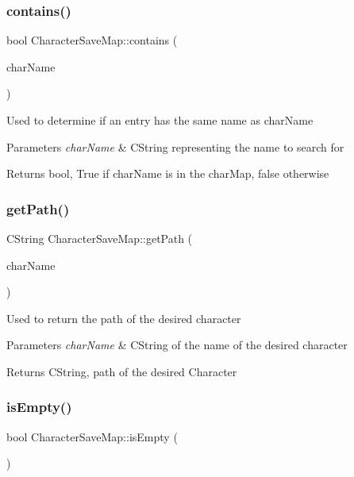 \subsubsection{\texorpdfstring{contains()}{contains()}}
{\footnotesize\ttfamily bool Character\+Save\+Map\+::contains (\begin{DoxyParamCaption}\item[{const C\+String \&}]{char\+Name }\end{DoxyParamCaption})}

Used to determine if an entry has the same name as char\+Name 
\begin{DoxyParams}{Parameters}
{\em char\+Name} & C\+String representing the name to search for \\
\hline
\end{DoxyParams}
\begin{DoxyReturn}{Returns}
bool, True if char\+Name is in the char\+Map, false otherwise 
\end{DoxyReturn}
\hypertarget{class_character_save_map_ae522be138bfeab45d12a255020150110}{}\label{class_character_save_map_ae522be138bfeab45d12a255020150110} 
\subsubsection{\texorpdfstring{get\+Path()}{getPath()}}
{\footnotesize\ttfamily C\+String Character\+Save\+Map\+::get\+Path (\begin{DoxyParamCaption}\item[{const C\+String \&}]{char\+Name }\end{DoxyParamCaption})}

Used to return the path of the desired character 
\begin{DoxyParams}{Parameters}
{\em char\+Name} & C\+String of the name of the desired character \\
\hline
\end{DoxyParams}
\begin{DoxyReturn}{Returns}
C\+String, path of the desired Character 
\end{DoxyReturn}
\hypertarget{class_character_save_map_ab184ee82d93d3e907a582f1924f05990}{}\label{class_character_save_map_ab184ee82d93d3e907a582f1924f05990} 
\subsubsection{\texorpdfstring{is\+Empty()}{isEmpty()}}
{\footnotesize\ttfamily bool Character\+Save\+Map\+::is\+Empty (\begin{DoxyParamCaption}{ }\end{DoxyParamCaption})}


